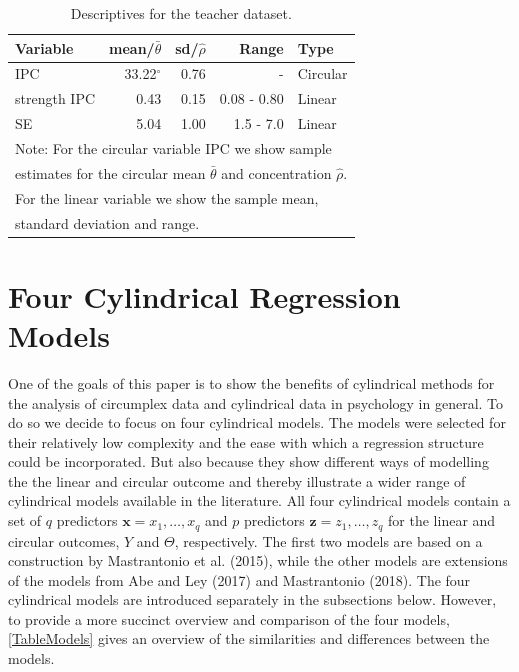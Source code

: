 \documentclass[man]{apa6}
\theoremstyle{definition}
\theoremstyle{definition}
\theoremstyle{definition}
\theoremstyle{remark}
\begin{document}
\begin{table}[h]
\centering
\caption{Descriptives for the teacher dataset.} 
\begin{tabular}{lrrrl}
  \noalign{\smallskip}\hline\noalign{\smallskip}
Variable & mean/$\bar{\theta}$ & sd/$\hat{\rho}$ & Range & Type \\ \hline\noalign{\smallskip}
IPC &33.22$^\circ$& 0.76 & - & Circular\\
strength IPC & 0.43 & 0.15 & 0.08 - 0.80 & Linear\\
SE & 5.04 & 1.00 & 1.5 - 7.0 & Linear\\
   \hline
\multicolumn{5}{l}{Note: For the circular variable IPC we show sample }\\
\multicolumn{5}{l}{estimates for the circular mean $\bar{\theta}$ and concentration $\hat{\rho}$.}\\
\multicolumn{5}{l}{For the linear variable we show the sample mean,}\\
\multicolumn{5}{l}{standard deviation and range.}
\end{tabular}
\label{Tableteacherdescriptives}
\end{table}

\section{Four Cylindrical Regression Models}\label{Models}

One of the goals of this paper is to show the benefits of cylindrical
methods for the analysis of circumplex data and cylindrical data in
psychology in general. To do so we decide to focus on four cylindrical
models. The models were selected for their relatively low complexity and
the ease with which a regression structure could be incorporated. But
also because they show different ways of modelling the the linear and
circular outcome and thereby illustrate a wider range of cylindrical
models available in the literature. All four cylindrical models contain
a set of \(q\) predictors \(\boldsymbol{x} = x_1, \dots, x_q\) and \(p\)
predictors \(\boldsymbol{z} = z_1, \dots, z_q\) for the linear and
circular outcomes, \(Y\) and \(\Theta\), respectively. The first two
models are based on a construction by Mastrantonio et al. (2015), while
the other models are extensions of the models from Abe and Ley (2017)
and Mastrantonio (2018). The four cylindrical models are introduced
separately in the subsections below. However, to provide a more succinct
overview and comparison of the four models, \ref{TableModels} gives an
overview of the similarities and differences between the models.
\end{document}
